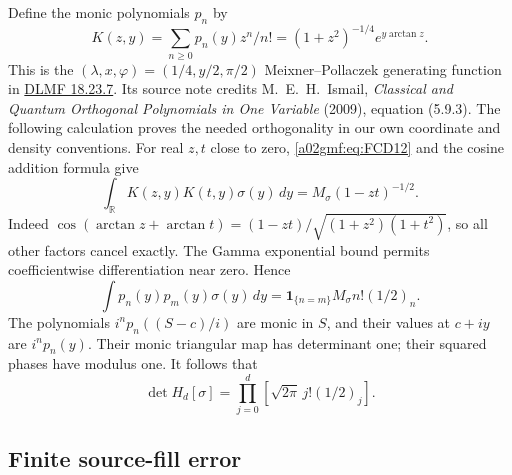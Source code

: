 Define the monic polynomials \(p_n\) by
\[
 K(z,y)=\sum_{n\ge0}p_n(y)z^n/n!
       =(1+z^2)^{-1/4}e^{y\arctan z}.
\]
This is the \((\lambda,x,\varphi)=(1/4,y/2,\pi/2)\)
Meixner--Pollaczek generating function in
\href{https://dlmf.nist.gov/18.23.E7}{DLMF 18.23.7}.
Its source note credits M.~E.~H.~Ismail, \emph{Classical and Quantum
Orthogonal Polynomials in One Variable} (2009), equation (5.9.3).
The following calculation proves the needed orthogonality in our own
coordinate and density conventions.
For real \(z,t\) close to zero, \eqref{a02gmf:eq:FCD12} and the cosine addition
formula give
\[
 \int_{\mathbb R}K(z,y)K(t,y)\sigma(y)\,dy
    =M_\sigma(1-zt)^{-1/2}.
\]
Indeed
\(\cos(\arctan z+\arctan t)
 =(1-zt)/\sqrt{(1+z^2)(1+t^2)}\), so all other factors cancel
exactly. The Gamma exponential bound permits coefficientwise
differentiation near zero. Hence
\begin{equation}
 \int p_n(y)p_m(y)\sigma(y)\,dy
       =\mathbf1_{\{n=m\}}M_\sigma n!(1/2)_n .
 \tag{FCD13}\label{a02gmf:eq:FCD13}
\end{equation}
The polynomials \(i^np_n((S-c)/i)\) are monic in \(S\), and their
values at \(c+iy\) are \(i^np_n(y)\). Their monic triangular map
has determinant one; their squared phases have modulus one.
It follows that
\begin{equation}
 \boxed{\displaystyle
 \det H_d[\sigma]
       =\prod_{j=0}^d\left[\sqrt{2\pi}\,j!(1/2)_j\right].}
 \tag{FCD14}\label{a02gmf:eq:FCD14}
\end{equation}

\subsection{Finite source-fill error}

